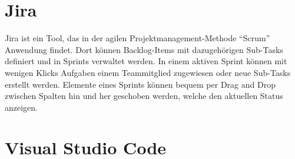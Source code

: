 \section{Jira}
Jira ist ein Tool, das in der agilen Projektmanagement-Methode \enquote{Scrum} Anwendung findet.
Dort können Backlog-Items mit dazugehörigen Sub-Tasks definiert und in Sprints verwaltet werden.
In einem aktiven Sprint können mit wenigen Klicks Aufgaben einem Teammitglied zugewiesen oder neue Sub-Tasks erstellt werden.
Elemente eines Sprints können bequem per Drag and Drop zwischen Spalten hin und her geschoben werden, welche den aktuellen Status anzeigen.

\section{Visual Studio Code}